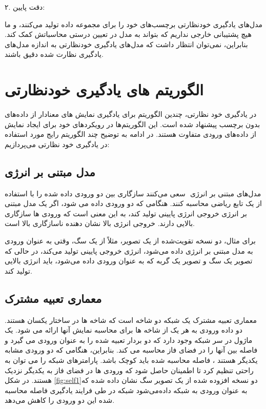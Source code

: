 ۲. دقت پایین:

مدل‌های یادگیری خودنظارتی برچسب‌های خود را برای مجموعه داده تولید می‌کنند، و ما هیچ پشتیبانی خارجی نداریم که بتواند به مدل در تعیین درستی محاسباتش کمک کند. بنابراین، نمی‌توان انتظار داشت که مدل‌های یادگیری خودنظارتی به اندازه مدل‌های یادگیری نظارت شده دقیق باشند.
  \citep{xie2022self}
  
\section{الگوریتم های یادگیری خودنظارتی}
در یادگیری خود نظارتی، چندین الگوریتم برای یادگیری نمایش های معنادار از داده‌های بدون برچسب پیشنهاد شده است. این الگوریتم‌ها در رویکردهای خود برای ایجاد نمایش از داده‌های ورودی متفاوت هستند. در ادامه به توضیح چند الگوریتم رایج مورد استفاده در یادگیری خود نظارتی می‌پردازیم:

\subsection{مدل مبتنی بر انرژی}


مدل‌های مبتنی بر انرژی ‌ سعی می‌کنند سازگاری بین دو ورودی داده شده را با استفاده از یک تابع ریاضی محاسبه کنند. هنگامی که دو ورودی داده می شود، اگر یک مدل مبتنی بر انرژی خروجی انرژی پایینی تولید کند، به این معنی است که ورودی ها سازگاری بالایی دارند. خروجی انرژی بالا نشان دهنده ناسازگاری بالا است.

برای مثال، دو نسخه تقویت‌شده از یک تصویر، مثلاً از یک سگ، وقتی به عنوان ورودی به مدل مبتنی بر انرژی داده می‌شود، انرژی خروجی پایینی تولید می‌کند، در حالی که تصویر یک سگ و تصویر یک گربه که به عنوان ورودی داده می‌شود، باید انرژی بالایی تولید کند. 
\citep{hsu2019self}
\subsection{ معماری تعبیه مشترک}

معماری تعبیه مشترک یک شبکه دو شاخه است که شاخه ها در ساختار یکسان هستند. دو داده ورودی به هر یک از شاخه ها برای محاسبه نمایش آنها ارائه می شود. یک ماژول در سر شبکه وجود دارد که دو بردار تعبیه شده را به عنوان ورودی می گیرد و فاصله بین آنها را در فضای فاز‌  محاسبه می کند.
\citep{assran2023self}
بنابراین، هنگامی که دو ورودی مشابه یکدیگر هستند ، فاصله محاسبه شده باید کوچک باشد. پارامترهای شبکه را می توان به راحتی تنظیم کرد تا اطمینان حاصل شود که ورودی ها در فضای فاز به یکدیگر نزدیک هستند. در شکل \ref{fig:self1}دو نسخه افزوده شده از یک تصویر سگ نشان داده شده که به عنوان ورودی به شبکه داده‌می‌شود شبکه در طی فرایند یادگیری فاصله محاسبه شده این دو ورودی را کاهش می‌دهد.

